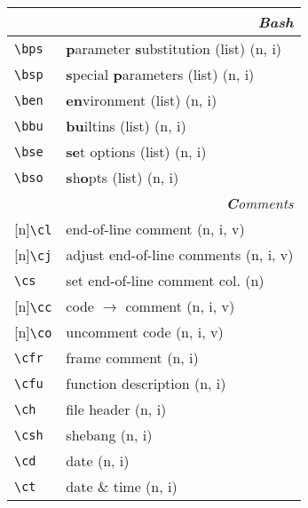 \documentclass[oneside,11pt,landscape,DIV16]{scrartcl}
\newcommand{\Rep}{{\scriptsize{[n]}}}
\begin{document}
\begin{multicols}{3}
\begin{center}
\begin{tabular}[]{|p{11mm}|p{60mm}|}
\hline 
\multicolumn{2}{|r|}{\textsl{\textbf{B}ash}}\\[1.0ex]
\hline \verb'\bps'   & \textbf{p}arameter \textbf{s}ubstitution (list) \hfill (n, i)\\
\hline \verb'\bsp'   & \textbf{s}pecial \textbf{p}arameters (list)     \hfill (n, i)\\
\hline \verb'\ben'   & \textbf{en}vironment (list)                     \hfill (n, i)\\
\hline \verb'\bbu'   & \textbf{bu}iltins (list)                        \hfill (n, i)\\
\hline \verb'\bse'   & \textbf{se}t options (list)                     \hfill (n, i)\\
\hline \verb'\bso'   & \textbf{s}h\textbf{o}pts (list)                 \hfill (n, i)\\
\hline 
\hline
\multicolumn{2}{|r|}{\textsl{\textbf{C}omments}}                       \\[1.0ex]
\hline \Rep\verb'\cl'   & end-of-line comment               \hfill (n, i, v)\\
\hline \Rep\verb'\cj'   & adjust end-of-line comments       \hfill (n, i, v)\\
\hline     \verb'\cs'   & set end-of-line comment col.      \hfill (n)\\
%
\hline \Rep\verb'\cc'   & code $\rightarrow$ comment        \hfill (n, i, v)\\
\hline \Rep\verb'\co'   & uncomment code                    \hfill (n, i, v)\\
%
\hline     \verb'\cfr'  & frame comment                     \hfill (n, i)\\
\hline     \verb'\cfu'  & function description              \hfill (n, i)\\
\hline     \verb'\ch'   & file header                       \hfill (n, i)\\
\hline     \verb'\csh'  & shebang                           \hfill (n, i)\\
\hline     \verb'\cd'   & date                              \hfill (n, i)\\
\hline     \verb'\ct'   & date \& time                      \hfill (n, i)\\
\hline
\end{tabular}\\

\end{center}
\end{multicols}
\end{document}
